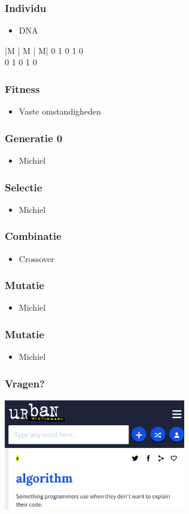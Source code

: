 \documentclass{beamer}
\begin{document}
\begin{frame}
  \frametitle{Individu}
  \begin{itemize}
      \item DNA
  \end{itemize}
  \begin{tabular}{|M | M | M|}
               0 1 0 1 0 \\  0 1 0 1 0 \\
              \hline
            \end{tabular}
\end{frame}

\begin{frame}
  \frametitle{Fitness}
  \begin{itemize}
      \item Vaste omstandigheden
  \end{itemize}
\end{frame}

\begin{frame}
  \frametitle{Generatie 0}
  \begin{itemize}
      \item Michiel
  \end{itemize}
\end{frame}

\begin{frame}
  \frametitle{Selectie}
  \begin{itemize}
      \item Michiel
  \end{itemize}
\end{frame}

\begin{frame}
  \frametitle{Combinatie}
  \begin{itemize}
      \item Crossover
  \end{itemize}
\end{frame}

\begin{frame}
  \frametitle{Mutatie}
  \begin{itemize}
      \item Michiel
  \end{itemize}
\end{frame}

\begin{frame}
  \frametitle{Mutatie}
  \begin{itemize}
      \item Michiel
  \end{itemize}
\end{frame}

\begin{frame}
  \frametitle{Vragen?}
  \includegraphics[width=300px]{algorithm.png}
\end{frame}
\end{document}

